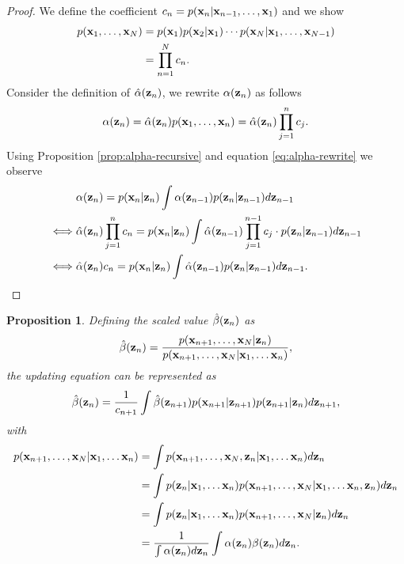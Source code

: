 \documentclass[12pt, oneside]{book}
\numberwithin{equation}{section}
\newcommand{\x}{{\bf x}}
\newcommand{\z}{{\bf z}}
\newtheorem{proposition}{Proposition}[section]
\begin{document}
{\begin{proof}
	We define the coefficient $c_n = p(\x_n \vert \x_{n-1}, \ldots, \x_1)$ and we show
	\begin{align}
		p(\x_1, \ldots, \x_N) &=  p(\x_1) p(\x_2 \vert \x_1) \cdots p(\x_N \vert \x_1, \ldots, \x_{N-1})\\
		&= \prod_{n=1}^N c_n.
	\end{align}
	Consider the definition of $\hat\alpha(\z_n)$, we rewrite $\alpha(\z_n)$ as follows
	\begin{equation} \label{eq:alpha-rewrite}
		\alpha(\z_n) = \hat\alpha(\z_n) p(\x_1, \ldots, \x_n) = \hat\alpha(\z_n) \prod_{j=1}^n c_j.
	\end{equation}
	Using Proposition \ref{prop:alpha-recursive} and equation \eqref{eq:alpha-rewrite} we observe
	\begin{align}
		&\alpha(\z_n) = p(\x_n\vert \z_n) \int  \alpha(\z_{n-1})p(\z_n\vert\z_{n-1}) d\z_{n-1}\\
		\iff & \hat\alpha(\z_n) \prod_{j=1}^{n} c_n = p(\x_n \vert \z_n) \int  \hat\alpha(\z_{n-1}) \prod_{j=1}^{n-1} c_j \cdot  p(\z_n\vert\z_{n-1}) d\z_{n-1}\\
		\iff & \hat\alpha(\z_n) c_n =   p(\x_n \vert \z_n) \int  \hat\alpha(\z_{n-1})   p(\z_n\vert\z_{n-1}) d\z_{n-1}.
	\end{align}
\end{proof}

\begin{proposition} \label{prop:beta-hat}
	Defining the scaled value $\hat\beta(\z_n)$ as
	\begin{equation}
		\hat\beta(\z_n) = \frac{p(\x_{n+1}, \ldots, \x_N \vert \z_n)}{p(\x_{n+1}, \ldots, \x_N \vert \x_1, \ldots \x_n)},
	\end{equation}
	the updating equation can be represented as
	\begin{equation}
		\hat\beta(\z_n) = \frac{1}{c_{n+1}}\int \hat\beta(\z_{n+1})p(\x_{n+1}\vert\z_{n+1})p(\z_{n+1}\vert\z_n) d\z_{n+1},
	\end{equation}
	with
	\begin{align}
		p(\x_{n+1}, \ldots, \x_N \vert \x_1, \ldots \x_n) &= \int p(\x_{n+1}, \ldots, \x_N, \z_n \vert \x_1, \ldots \x_n) d\z_n\\
		&= \int p(\z_n \vert \x_1, \ldots \x_n) p(\x_{n+1}, \ldots, \x_N \vert \x_1, \ldots \x_n, \z_n) d\z_n \nonumber\\
		&= \int p(\z_n \vert \x_1, \ldots \x_n) p(\x_{n+1}, \ldots, \x_N \vert \z_n) d\z_n\\
		&= \frac{1}{\int \alpha(\z_n) d\z_n} \int \alpha(\z_n) \beta(\z_n) d\z_n.
	\end{align}
\end{proposition}

}
\end{document}
